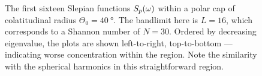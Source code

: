 \begin{figure}[htpb]
	\newline
	\hfill
	\hfill
	\hfill
	\caption[
		The Slepian functions within a \(\SI{40}{\degree}\) polar cap
	]{
		The first sixteen Slepian functions \({S}_{p}(\omega)\) within a polar cap of colatitudinal radius \(\Theta_{0}=\SI{40}{\degree}\).
		The bandlimit here is  \(L=16\), which corresponds to a Shannon number of \(N=30\).
		Ordered by decreasing eigenvalue, the plots are shown left-to-right, top-to-bottom --- indicating worse concentration within the region.
		Note the similarity with the spherical harmonics in this straightforward region.
	}\label{fig:chapter2_slepian_polar_cap}
\end{figure}
